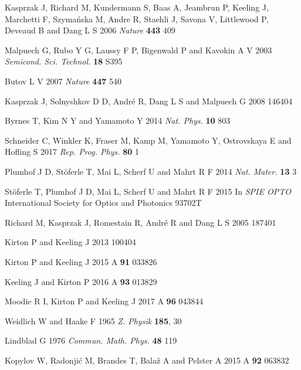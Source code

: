 \documentclass[12pt, a4paper]{iopart}
\begin{document}
\begin{thebibliography}{84}
Kasprzak J, Richard M, Kundermann S, Baas A, Jeambrun P, Keeling J, Marchetti F, Szyma{\'n}ska M, Andre R, Staehli J, Savona V,
Littlewood P, Deveaud B and Dang L S 2006 {\it Nature} {\bf 443} 409

Malpuech G, Rubo Y G, Laussy F P, Bigenwald P and Kavokin A V 2003 {\it Semicond. Sci. Technol.} {\bf 18} S395

Butov L V 2007 {\it Nature} {\bf 447} 540

Kasprzak J, Solnyshkov D D, Andr\'e R, Dang L S and Malpuech G 2008  146404

Byrnes T, Kim N Y and Yamamoto Y 2014 {\it Nat. Phys.} {\bf 10} 803

Schneider C, Winkler K, Fraser M, Kamp M, Yamamoto Y, Ostrovskaya E and Hofling S
 2017 {\it Rep. Prog. Phys.} {\bf 80} 1

Plumhof J D, St{\"o}ferle T, Mai L, Scherf U and Mahrt R F 2014 {\it Nat. Mater.} {\bf 13} 3

St{\"o}ferle T, Plumhof J D, Mai L, Scherf U and Mahrt R F 2015 In {\it SPIE OPTO} International Society for Optics and Photonics 93702T

Richard M, Kasprzak J, Romestain R, Andr\'e R and Dang L S 2005  187401

Kirton P and Keeling J 2013  100404

Kirton P and Keeling J 2015 \PR A {\bf 91} 033826

Keeling J and Kirton P 2016 \PR A {\bf 93} 013829

Moodie R I, Kirton P and Keeling J 2017 \PR A {\bf 96} 043844

Weidlich W and Haake F 1965 {\it Z. Physik} {\bf 185}, 30 

Lindblad G 1976 {\it Commun. Math. Phys.} {\bf 48} 119

Kopylov W, Radonji\'{c} M, Brandes T, Bala\v{z} A and Pelster A 2015 \PR A {\bf 92} 063832


\end{thebibliography}
\end{document}
